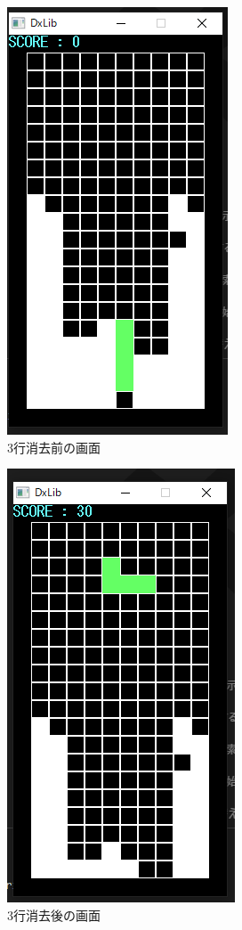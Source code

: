 \begin{figure}[htb]
  \begin{center}
    \includegraphics[scale=0.5]{./soft_img/threelinebefore.png}
    \caption{3行消去前の画面}
    \label{three1}
  \end{center}
\end{figure}
\begin{figure}[htb]
  \begin{center}
    \includegraphics[scale=0.5]{./soft_img/threelineafter.png}
    \caption{3行消去後の画面}
    \label{three2}
  \end{center}
\end{figure}
